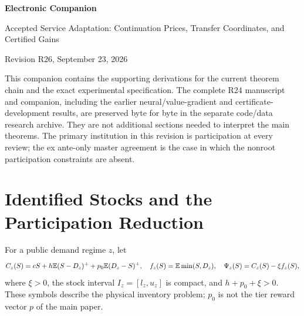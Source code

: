 \documentclass[11pt,letterpaper]{article}
\theoremstyle{definition}\newtheorem{remark}[theorem]{Remark}
\begin{document}
\begin{center}{\Large\bfseries Electronic Companion}\par\vspace{.12in}
Accepted Service Adaptation: Continuation Prices, Transfer Coordinates, and Certified Gains\par
Revision R26, September 23, 2026\end{center}
This companion contains the supporting derivations for the current theorem chain and the exact experimental specification. The complete R24 manuscript and companion, including the earlier neural/value-gradient and certificate-development results, are preserved byte for byte in the separate code/data research archive. They are not additional sections needed to interpret the main theorems. The primary institution in this revision is participation at every review; the ex ante-only master agreement is the case in which the nonroot participation constraints are absent.

\section{Identified Stocks and the Participation Reduction}\label{ec:stock}
For a public demand regime $z$, let
\[
 C_z(S)=cS+h\mathbb E(S-D_z)^++p_0\mathbb E(D_z-S)^+,\quad
 f_z(S)=\mathbb E\min(S,D_z),\quad \Psi_z(S)=C_z(S)-\xi f_z(S),
\]
where $\xi>0$, the stock interval $I_z=[l_z,u_z]$ is compact, and $h+p_0+\xi>0$. These symbols describe the physical inventory problem; $p_0$ is not the tier reward vector $p$ of the main paper.
\end{document}

